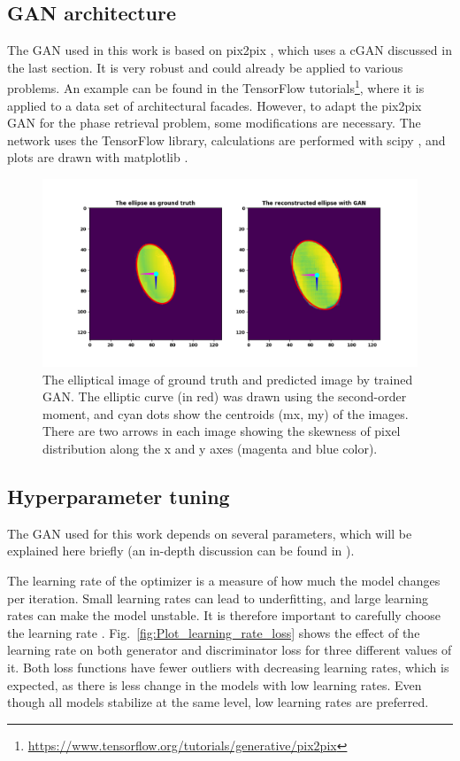 \subsection{GAN architecture}
The GAN used in this work is based on pix2pix \citep{isola2017image}, which uses a cGAN discussed in the last section. It is very robust and could already be applied to various problems. An example can be found in the TensorFlow tutorials\footnote{\url{https://www.tensorflow.org/tutorials/generative/pix2pix}}, where it is applied to a data set of architectural facades. However, to adapt the pix2pix GAN for the phase retrieval problem, some modifications are necessary. The network uses the TensorFlow \citep{abadi2016tensorflow} library, calculations are performed with scipy \citep{virtanen2020scipy}, and plots are drawn with matplotlib \citep{4160265}.
\begin{figure}
	\includegraphics[width=\linewidth]{fig/reconstruction.png}
	\caption{The elliptical image of ground truth and predicted image by trained GAN. The elliptic curve (in red) was drawn using the second-order moment, and cyan dots show the centroids (mx, my) of the images. There are two arrows in each image showing the skewness of pixel distribution along the x and y axes (magenta and blue color).}
	\label{fig:recons}
\end{figure}
\subsection{Hyperparameter tuning}
The GAN used for this work depends on several parameters, which will be explained here briefly (an in-depth discussion can be found in \citep{murphy2022probabilistic}).

The learning rate of the optimizer is a measure of how much the model changes per iteration. Small learning rates can lead to underfitting, and large learning rates can make the model unstable. It is therefore important to carefully choose the learning rate \citep{murphy2022probabilistic}. Fig.~\ref{fig:Plot_learning_rate_loss} shows the effect of the learning rate on both generator and discriminator loss for three different values of it. Both loss functions have fewer outliers with decreasing learning rates, which is expected, as there is less change in the models with low learning rates. Even though all models stabilize at the same level, low learning rates are preferred.

